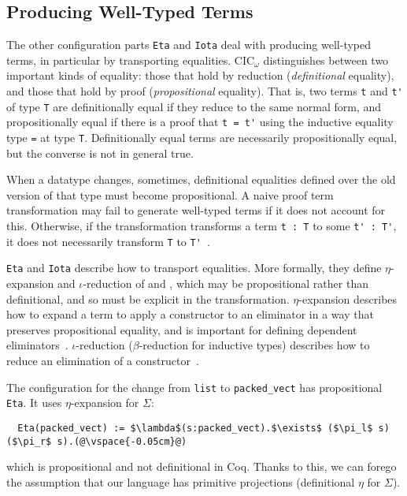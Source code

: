 \subsection{Producing Well-Typed Terms}
\label{sec:pi-diff-equal}

The other configuration parts \lstinline{Eta} and \lstinline{Iota} deal with producing well-typed terms,
in particular by transporting equalities.
CIC$_{\omega}$ distinguishes between two important kinds of equality: those that hold by reduction (\textit{definitional} equality), and those that hold by proof (\textit{propositional} equality).
That is, two terms \lstinline{t} and \lstinline{t'} of type \lstinline{T} are definitionally equal if they reduce to the same normal form,
and propositionally equal if there is a proof that \lstinline{t = t'} using the inductive
equality type \lstinline{=} at type \lstinline{T}. Definitionally equal terms are necessarily propositionally equal, but 
the converse is not in general true. %

When a datatype changes, sometimes, definitional equalities defined over the old version of that type must become propositional.
A naive proof term transformation may fail to generate well-typed terms if it does not account for this.
Otherwise, if the transformation transforms a term \lstinline{t : T} to some \lstinline{t' : T'}, it does not necessarily
transform \lstinline{T} to \lstinline{T'}~\cite{tabareau2019marriage}.

\lstinline{Eta} and \lstinline{Iota} describe how to transport equalities.
More formally, they define $\eta$-expansion and $\iota$-reduction of \Aa and \B,
which may be propositional rather than definitional,
and so must be explicit in the transformation.
$\eta$-expansion describes how to expand a term to apply a constructor to an eliminator in a way that preserves propositional equality,
and is important for defining dependent eliminators~\cite{nlab:eta-conversion}.
$\iota$-reduction ($\beta$-reduction for inductive types) describes how to reduce an elimination of a constructor~\cite{nlab:beta-reduction}.

The configuration for the change from \lstinline{list} to \lstinline{packed_vect} has propositional \lstinline{Eta}.
It uses $\eta$-expansion for $\Sigma$:

\begin{lstlisting}
  Eta(packed_vect) := $\lambda$(s:packed_vect).$\exists$ ($\pi_l$ s) ($\pi_r$ s).(@\vspace{-0.05cm}@)
\end{lstlisting}
which is propositional and not definitional in Coq.
Thanks to this, we can forego the assumption that our language has primitive projections (definitional $\eta$ for $\Sigma$).

